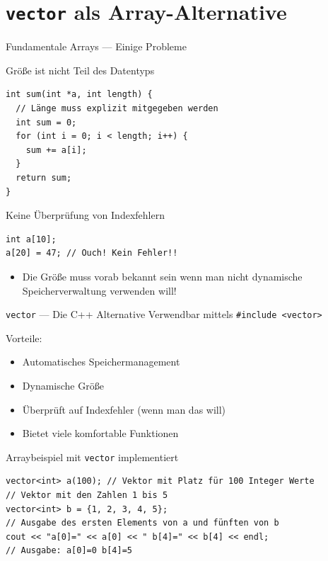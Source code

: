 \documentclass[presentation]{beamer}
\begin{document}
\section{\texttt{vector} als Array-Alternative}
\label{sec:org45cae57}
\begin{frame}[label={sec:org049c69f},fragile]{Fundamentale Arrays --- Einige Probleme}
 \begin{block}{Größe ist nicht Teil des Datentyps}
\begin{verbatim}
int sum(int *a, int length) {
  // Länge muss explizit mitgegeben werden
  int sum = 0;
  for (int i = 0; i < length; i++) {
    sum += a[i];
  }
  return sum;
}
\end{verbatim}
\end{block}
\begin{block}{Keine Überprüfung von Indexfehlern}
\begin{verbatim}
int a[10];
a[20] = 47; // Ouch! Kein Fehler!!
\end{verbatim}
\end{block}
\begin{itemize}
\item Die Größe muss vorab bekannt sein wenn man nicht dynamische
Speicherverwaltung verwenden will!
\end{itemize}
\end{frame}
\begin{frame}[label={sec:org644f764},fragile]{{\color{solarizedYellow}\texttt{vector}} --- Die C++ Alternative}
 Verwendbar mittels {\color{solarizedYellow}\verb!#include <vector>!}

Vorteile:
\begin{itemize}
\item Automatisches Speichermanagement
\item Dynamische Größe
\item Überprüft auf Indexfehler (wenn man das will)
\item Bietet viele komfortable Funktionen
\end{itemize}
\begin{exampleblock}{Arraybeispiel mit {\color{solarizedYellow}\texttt{vector}} implementiert}
\begin{verbatim}
vector<int> a(100); // Vektor mit Platz für 100 Integer Werte
// Vektor mit den Zahlen 1 bis 5
vector<int> b = {1, 2, 3, 4, 5};
// Ausgabe des ersten Elements von a und fünften von b
cout << "a[0]=" << a[0] << " b[4]=" << b[4] << endl;
// Ausgabe: a[0]=0 b[4]=5
\end{verbatim}
\end{exampleblock}
\end{frame}
\end{document}

